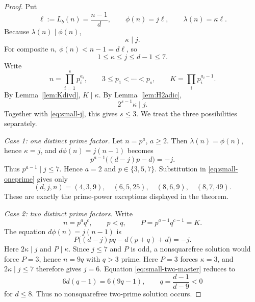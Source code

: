 \documentclass[11pt]{article}
\begin{document}
\begin{proof}
Put
\[
\ell:=L_b(n)=\frac{n-1}{d},
\qquad
\phi(n)=j\ell,
\qquad
\lambda(n)=\kappa\ell.
\]
Because $\lambda(n)\mid\phi(n)$,
\[
\kappa\mid j.
\]
For composite $n$, $\phi(n)<n-1=d\ell$, so
\begin{equation}
1\le \kappa\le j\le d-1\le7.
\tag{S1}\label{eq:small-j}
\end{equation}
Write
\[
n=\prod_{i=1}^{s}p_i^{a_i},
\qquad 3\le p_1<\cdots<p_s,
\qquad
K=\prod_i p_i^{a_i-1}.
\]
By Lemma~\ref{lem:Kdivd}, $K\mid \kappa$.  By
Lemma~\ref{lem:H2adic},
\[
2^{s-1}\kappa\mid j.
\]
Together with \eqref{eq:small-j}, this gives $s\le3$.  We treat the three
possibilities separately.

\medskip
\noindent\textit{Case 1: one distinct prime factor.}
Let $n=p^a$, $a\ge2$.  Then $\lambda(n)=\phi(n)$, hence $\kappa=j$, and
$d\phi(n)=j(n-1)$ becomes
\begin{equation}
p^{a-1}\bigl((d-j)p-d\bigr)=-j.
\tag{S2}\label{eq:small-oneprime}
\end{equation}
Thus $p^{a-1}\mid j\le7$.  Hence $a=2$ and
$p\in\{3,5,7\}$.  Substitution in \eqref{eq:small-oneprime} gives only
\[
(d,j,n)=(4,3,9),\quad(6,5,25),\quad(8,6,9),\quad(8,7,49).
\]
These are exactly the prime-power exceptions displayed in the theorem.

\medskip
\noindent\textit{Case 2: two distinct prime factors.}
Write
\[
n=p^a q^c,
\qquad p<q,
\qquad
P=p^{a-1}q^{c-1}=K.
\]
The equation $d\phi(n)=j(n-1)$ is
\begin{equation}
P\bigl((d-j)pq-d(p+q)+d\bigr)=-j.
\tag{S3}\label{eq:small-two-master}
\end{equation}
Here $2\kappa\mid j$ and $P\mid \kappa$.  Since $j\le7$ and $P$ is odd, a
nonsquarefree solution would force $P=3$, hence $n=9q$ with $q>3$ prime.
Here $P=3$ forces $\kappa=3$, and $2\kappa\mid j\le7$ therefore gives
$j=6$.  Equation \eqref{eq:small-two-master} reduces to
\[
6d(q-1)=6(9q-1),
\qquad
q=\frac{d-1}{d-9}<0
\]
for $d\le8$.  Thus no nonsquarefree two-prime solution occurs.


\end{proof}
\end{document}
